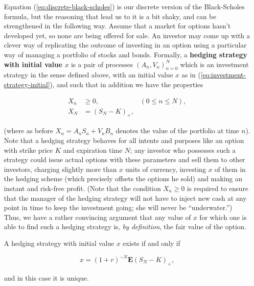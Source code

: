Equation (\ref{eq:discrete-black-scholes}) is our
discrete version of the Black-Scholes formula, but the
reasoning that lead us to it is a bit shaky, and can
be strengthened in the following way. Assume that a
market for options hasn't developed yet, so none are
being offered for sale. An investor may come up with a
clever way of replicating the outcome of investing in
an option using a particular way of managing a
portfolio of stocks and bonds. Formally, a \textbf{hedging
strategy with initial value $x$} is a pair of
processes $(A_n,V_n)_{n=0}^N$ which is an investment
strategy in the sense defined above, with an initial
value $x$ as in (\ref{eq:investment-strategy-initial}),
and such that in addition we have the properties

\begin{align*}
X_n &\ge 0,  \qquad \qquad \qquad (0\le n\le N), \\
X_N &= (S_N-K)_+,
\end{align*}

\noindent (where as before $X_n = A_n S_n + V_n B_n$ denotes
the value of the portfolio at time $n$). Note that a
hedging strategy behaves for all intents and purposes
like an option with strike price $K$ and expiration
time $N$; any investor who possesses such a strategy
could issue actual options with these parameters and
sell them to other investors, charging slightly more
than $x$ units of currency, investing $x$ of them in
the hedging scheme (which precisely offsets the
options he sold) and making an instant and risk-free
profit. (Note that the condition $X_n\ge0$ is
required to ensure that the manager of the hedging
strategy will not have to inject new cash at any point
in time to keep the investment going; she will never
be ``underwater.'') Thus, we have a rather convincing
argument that any value of $x$ for which one is able
to find such a hedging strategy is, \emph{by definition},
the fair value of the option.

\begin{thm}
A hedging strategy with initial value $x$ exists if
and only if

\begin{equation*} \tag{12}\label{eq:hedging-strategy-condition}
x=(1+r)^{-N}\mathbf{E}(S_N-K)_+,
\end{equation*}

\noindent and in this case it is unique.
\end{thm}

